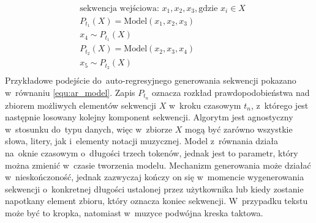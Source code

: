 \documentclass[data-science]{agh-wi} %
\begin{document}
\begin{equation}
    \begin{aligned}
         & \text{sekwencja wejściowa: } x_1, x_2, x_3, \text{gdzie } x_i \in X \\
         & P_{t_1}(X) = \text{Model}(x_1, x_2, x_3)                            \\
         & x_4 \sim P_{t_1}(X)                                                 \\
         & P_{t_2}(X) = \text{Model}(x_2, x_3, x_4)                            \\
         & x_5 \sim P_{t_2}(X)                                                 \\
    \end{aligned}
    \label{equ:ar_model}
\end{equation}
Przykładowe podejście do~auto-regresyjnego generowania sekwencji pokazano w~równaniu \ref*{equ:ar_model}. Zapis $P_{t_n}$ oznacza rozkład prawdopodobieństwa nad zbiorem możliwych elementów sekwencji $X$ w~kroku czasowym $t_n$, z~którego jest następnie losowany kolejny komponent sekwencji. Algorytm jest agnostyczny w~stosunku do~typu danych, więc w~zbiorze $X$ mogą być zarówno wszystkie słowa, litery, jak i~elementy notacji muzycznej. Model z~równania działa na~oknie czasowym o~długości trzech tokenów, jednak jest to parametr, który można zmienić w~czasie tworzenia modelu. Mechanizm generowania może działać w~nieskończoność, jednak zazwyczaj kończy on się w~momencie wygenerowania sekwencji o~konkretnej długości ustalonej przez użytkownika lub kiedy zostanie napotkany element zbioru, który oznacza koniec sekwencji. W~przypadku tekstu może być to kropka, natomiast w~muzyce podwójna kreska taktowa.
\end{document}
